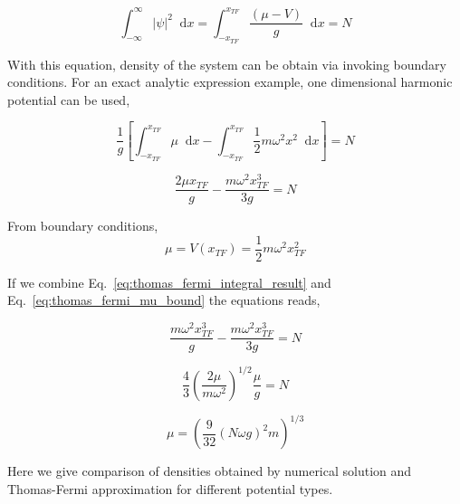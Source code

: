 \documentclass[a4paper,times,hidelinks,12pt]{article}
\newcommand*\dif{\mathop{}\!\mathrm{d}}
\begin{document}
\begin{equation}
    \label{eq:thomas_fermi_mu_integral}
        \int_{-\infty}^{\infty} |\psi|^2 \dif x = \int_{-x_{TF}}^{x_{TF}} \frac{(\mu - V)}{g} \dif x = N 
    \end{equation}

With this equation, density of the system can be obtain via invoking boundary conditions. For an exact analytic expression example, one dimensional harmonic potential can be used, 

\begin{equation}
   \frac{1}{g} \left [ \int_{-x_{TF}}^{x_{TF}} \mu \dif x - \int_{-x_{TF}}^{x_{TF}} \frac{1}{2}m\omega^2x^2 \dif x \right ] = N
\end{equation}

\begin{equation}
\label{eq:thomas_fermi_integral_result}
    \frac{2\mu x_{TF}}{g} - \frac{m\omega^2 x_{TF}^3}{3g} = N
\end{equation}


From boundary conditions,
\begin{equation}
\label{eq:thomas_fermi_mu_bound}
    \mu = V(x_{TF}) = \frac{1}{2}m\omega^2x_{TF}^2    
\end{equation}


If we combine Eq.~\eqref{eq:thomas_fermi_integral_result} and Eq.~\eqref{eq:thomas_fermi_mu_bound} the equations reads,

\begin{equation}
    \frac{m\omega^2 x_{TF}^3}{g} - \frac{m\omega^2 x_{TF}^3}{3g} = N
\end{equation}


\begin{equation}
    \frac{4}{3} \left( \frac{2\mu}{m\omega^2} \right)^{1/2} \frac{\mu}{g} = N
\end{equation}

\begin{equation}
    \mu = \left(\frac{9}{32} (N\omega g)^2 m \right)^{1/3}
\end{equation}

Here we give comparison of densities obtained by numerical solution and Thomas-Fermi approximation for different potential types. 
\end{document}
